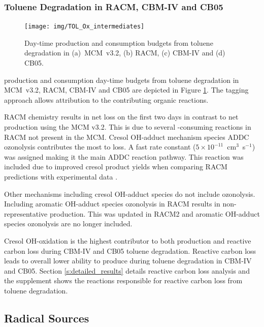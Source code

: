 \subsubsection{Toluene Degradation in RACM, CBM-IV and CB05} \label{sss:aromatic}

\begin{figure}
    \centering
    \texttt{[image: img/TOL\_Ox\_intermediates]}
    \vspace{0mm}
    \caption{Day-time  production and consumption budgets from toluene degradation in \mbox{(a) MCM v3.2}, (b) RACM, (c) CBM-IV and (d) CB05.}
    \vspace{-4mm}
    \label{f:toluene_Ox}
\end{figure}

 production and consumption day-time budgets from toluene degradation in \mbox{MCM v3.2}, RACM, CBM-IV and CB05 are depicted in Figure \ref{f:toluene_Ox}. 
The tagging approach allows attribution to the contributing organic reactions.

RACM chemistry results in net  loss on the first two days in contrast to net  production using the MCM v3.2.
This is due to several -consuming reactions in RACM not present in the MCM.
Cresol OH-adduct mechanism species ADDC ozonolysis contributes the most to  loss.
A fast rate constant \mbox{($5 \times 10^{-11}$ cm$^3$ s$^{-1}$)} was assigned making it the main ADDC reaction pathway. 
This reaction was included due to improved cresol product yields when comparing RACM predictions with experimental data \citep{Stockwell:1997}.

Other mechanisms including cresol OH-adduct species do not include ozonolysis.
Including aromatic OH-adduct species ozonolysis in RACM results in non-representative  production. 
This was updated in RACM2 and aromatic OH-adduct species ozonolysis are no longer included.

Cresol OH-oxidation is the highest contributor to both  production and reactive carbon loss during CBM-IV and CB05 toluene degradation.
Reactive carbon loss leads to overall lower ability to produce  during toluene degradation in CBM-IV and CB05.
Section \ref{s:detailed_results} details reactive carbon loss analysis and the supplement shows the reactions responsible for reactive carbon loss from toluene degradation.

\subsection{Radical Sources} \label{ss:radicals}

